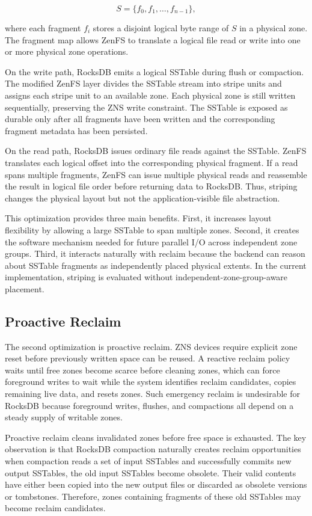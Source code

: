 \documentclass[letterpaper,twocolumn,10pt]{article}
\begin{document}
\[
S = \{f_0, f_1, \ldots, f_{n-1}\},
\]

where each fragment \(f_i\) stores a disjoint logical byte range of \(S\) in a physical zone. The fragment map allows ZenFS to translate a logical file read or write into one or more physical zone operations.

On the write path, RocksDB emits a logical SSTable during flush or compaction. The modified ZenFS layer divides the SSTable stream into stripe units and assigns each stripe unit to an available zone. Each physical zone is still written sequentially, preserving the ZNS write constraint. The SSTable is exposed as durable only after all fragments have been written and the corresponding fragment metadata has been persisted.

On the read path, RocksDB issues ordinary file reads against the SSTable. ZenFS translates each logical offset into the corresponding physical fragment. If a read spans multiple fragments, ZenFS can issue multiple physical reads and reassemble the result in logical file order before returning data to RocksDB. Thus, striping changes the physical layout but not the application-visible file abstraction.

This optimization provides three main benefits. First, it increases layout flexibility by allowing a large SSTable to span multiple zones. Second, it creates the software mechanism needed for future parallel I/O across independent zone groups. Third, it interacts naturally with reclaim because the backend can reason about SSTable fragments as independently placed physical extents. In the current implementation, striping is evaluated without independent-zone-group-aware placement.

\subsection{Proactive Reclaim}
\label{subsec:proactive-reclaim}

The second optimization is proactive reclaim. ZNS devices require explicit zone reset before previously written space can be reused. A reactive reclaim policy waits until free zones become scarce before cleaning zones, which can force foreground writes to wait while the system identifies reclaim candidates, copies remaining live data, and resets zones. Such emergency reclaim is undesirable for RocksDB because foreground writes, flushes, and compactions all depend on a steady supply of writable zones.

Proactive reclaim cleans invalidated zones before free space is exhausted. The key observation is that RocksDB compaction naturally creates reclaim opportunities when compaction reads a set of input SSTables and successfully commits new output SSTables, the old input SSTables become obsolete. Their valid contents have either been copied into the new output files or discarded as obsolete versions or tombstones. Therefore, zones containing fragments of these old SSTables may become reclaim candidates.
\end{document}
